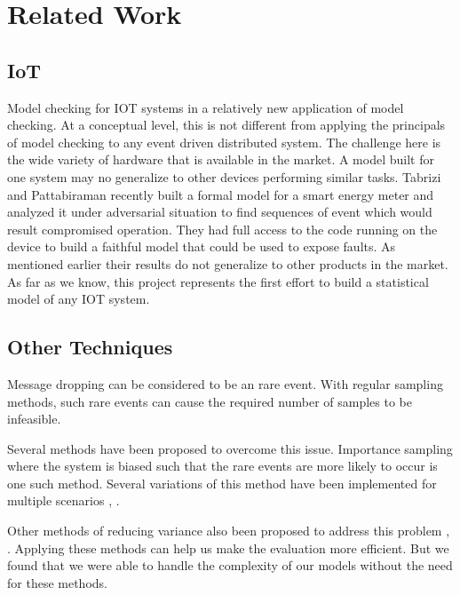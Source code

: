 \section{Related Work}

\subsection{IoT}
Model checking for IOT systems in a relatively new application of model checking. At a conceptual  level, this is not different from applying the principals of model checking to any event driven distributed system. The challenge here is the wide variety of hardware that is available in the market. A model built for one system may no generalize to other devices performing similar tasks. Tabrizi and Pattabiraman \cite{Tabrizi} recently built a formal model for a smart energy meter and analyzed it under adversarial situation to find sequences of event which would result compromised operation. They had full access to the code running on the device to build a faithful model that could be used to expose faults. As mentioned earlier their results do not generalize to other products in the market. As far as we know, this project represents the first effort to build a statistical model of any IOT system.

\subsection{Other Techniques}
Message dropping can be considered to be an rare event. With regular
sampling methods, such rare events can cause the required number of
samples to be infeasible.

Several methods have been proposed to overcome this issue. Importance
sampling where the system is biased such that the rare events are more
likely to occur is one such method. Several variations of this method
have been implemented for multiple scenarios \cite{rajan}, \cite{ballarini}.

Other methods of reducing variance also been proposed to address this
problem \cite{Jegourel}, \cite{lecuyer}.  Applying these methods can
help us make the evaluation more efficient. But we found that we were
able to handle the complexity of our models without the need for
these methods.
